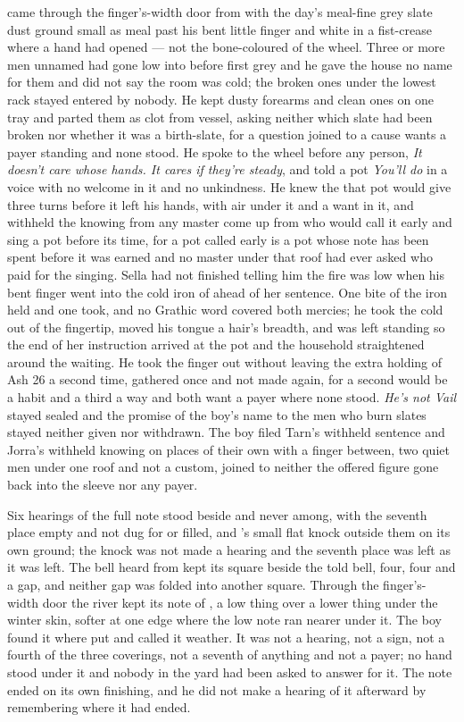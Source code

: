  came through the finger's-width door from  with the day's meal-fine grey slate dust ground small as meal past his bent little finger and white in a fist-crease where a hand had opened --- not the bone-coloured  of the wheel. Three or more men unnamed had gone low into  before first grey and he gave the house no name for them and did not say the room was cold; the broken ones under the lowest rack stayed entered by nobody. He kept dusty forearms and clean ones on one tray and parted them as clot from vessel, asking neither which slate had been broken nor whether it was a birth-slate, for a question joined to a cause wants a payer standing and none stood. He spoke to the wheel before any person, \emph{It doesn't care whose hands. It cares if they're steady}, and told a pot \emph{You'll do} in a voice with no welcome in it and no unkindness. He knew the  that pot would give three turns before it left his hands, with air under it and a want in it, and withheld the knowing from any master come up from  who would call it early and sing a pot before its time, for a pot called early is a pot whose note has been spent before it was earned and no master under that roof had ever asked who paid for the singing. Sella had not finished telling him the fire was low when his bent finger went into the cold iron of  ahead of her sentence. One bite of the iron held and one took, and no Grathic word covered both mercies; he took the cold out of the fingertip, moved his tongue a hair's breadth, and was left standing so the end of her instruction arrived at the pot and the household straightened around the waiting. He took the finger out without leaving the extra holding of Ash 26 a second time, gathered once and not made again, for a second would be a habit and a third a way and both want a payer where none stood. \emph{He's not Vail} stayed sealed and the promise of the boy's name to the men who burn slates stayed neither given nor withdrawn. The boy filed Tarn's withheld sentence and Jorra's withheld knowing on places of their own with a finger between, two quiet men under one roof and not a custom, joined to neither the offered figure gone back into the sleeve nor any payer.

Six hearings of the full note stood beside and never among, with the seventh place empty and not dug for or filled, and 's small flat knock outside them on its own ground; the knock was not made a hearing and the seventh place was left as it was left. The bell heard from  kept its square beside the told bell, four, four and a gap, and neither gap was folded into another square. Through the finger's-width door the river kept its note of , a low thing over a lower thing under the winter skin, softer at one edge where the low note ran nearer under it. The boy found it where put and called it weather. It was not a hearing, not a sign, not a fourth of the three coverings, not a seventh of anything and not a payer; no hand stood under it and nobody in the yard had been asked to answer for it. The note ended on its own finishing, and he did not make a hearing of it afterward by remembering where it had ended.

